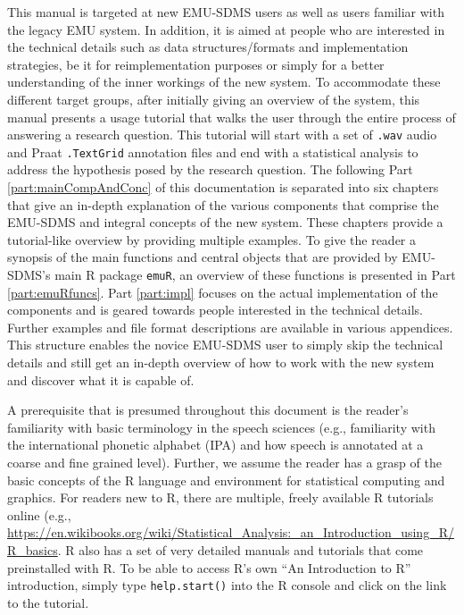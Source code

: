 \documentclass[]{book}
\theoremstyle{definition}
\theoremstyle{definition}
\theoremstyle{definition}
\theoremstyle{remark}
\begin{document}
This manual is targeted at new EMU-SDMS users as well as users familiar
with the legacy EMU system. In addition, it is aimed at people who are
interested in the technical details such as data structures/formats and
implementation strategies, be it for reimplementation purposes or simply
for a better understanding of the inner workings of the new system. To
accommodate these different target groups, after initially giving an
overview of the system, this manual presents a usage tutorial that walks
the user through the entire process of answering a research question.
This tutorial will start with a set of \texttt{.wav} audio and Praat
\texttt{.TextGrid} \citep{boersma:2011a} annotation files and end with a
statistical analysis to address the hypothesis posed by the research
question. The following Part \ref{part:mainCompAndConc} of this
documentation is separated into six chapters that give an in-depth
explanation of the various components that comprise the EMU-SDMS and
integral concepts of the new system. These chapters provide a
tutorial-like overview by providing multiple examples. To give the
reader a synopsis of the main functions and central objects that are
provided by EMU-SDMS's main R package \texttt{emuR}, an overview of
these functions is presented in Part \ref{part:emuRfuncs}. Part
\ref{part:impl} focuses on the actual implementation of the components
and is geared towards people interested in the technical details.
Further examples and file format descriptions are available in various
appendices. This structure enables the novice EMU-SDMS user to simply
skip the technical details and still get an in-depth overview of how to
work with the new system and discover what it is capable of.

A prerequisite that is presumed throughout this document is the reader's
familiarity with basic terminology in the speech sciences (e.g.,
familiarity with the international phonetic alphabet (IPA) and how
speech is annotated at a coarse and fine grained level). Further, we
assume the reader has a grasp of the basic concepts of the R language
and environment for statistical computing and graphics. For readers new
to R, there are multiple, freely available R tutorials online (e.g.,
\url{https://en.wikibooks.org/wiki/Statistical_Analysis:_an_Introduction_using_R/R_basics}.
R also has a set of very detailed manuals and tutorials that come
preinstalled with R. To be able to access R's own ``An Introduction to
R'' introduction, simply type \texttt{help.start()} into the R console
and click on the link to the tutorial.
\end{document}
